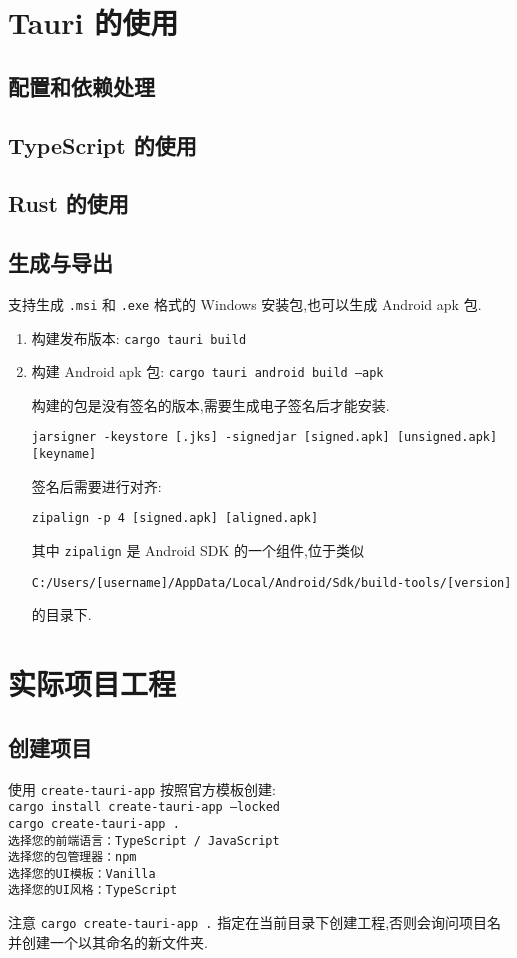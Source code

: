 
\usepackage{../../lectures_preamble}


    \section{Tauri 的使用}
        \subsection{配置和依赖处理}
        \subsection{TypeScript 的使用}
        \subsection{Rust 的使用}
        \subsection{生成与导出}
            支持生成 \texttt{.msi} 和 \texttt{.exe} 格式的 Windows 安装包,也可以生成 Android apk 包.

            \begin{enumerate}
                \item 构建发布版本: \texttt{cargo tauri build}
                \item 构建 Android apk 包: \texttt{cargo tauri android build --apk}

                    构建的包是没有签名的版本,需要生成电子签名后才能安装.

                    \texttt{jarsigner -keystore [.jks] -signedjar [signed.apk] [unsigned.apk] [keyname]}

                    签名后需要进行对齐:

                    \texttt{zipalign -p 4 [signed.apk] [aligned.apk]}

                    其中 \texttt{zipalign} 是 Android SDK 的一个组件,位于类似
                    
                    \texttt{C:/Users/[username]/AppData/Local/Android/Sdk/build-tools/[version]}

                    的目录下.
            \end{enumerate}
    \section{实际项目工程}
        \subsection{创建项目}
            使用 \texttt{create-tauri-app} 按照官方模板创建:
        \texttt{\\cargo install create-tauri-app ---locked\\cargo create-tauri-app .\\选择您的前端语言：TypeScript / JavaScript\\
选择您的包管理器：npm\\
选择您的UI模板：Vanilla\\
选择您的UI风格：TypeScript}

            注意 \texttt{cargo create-tauri-app .} 指定在当前目录下创建工程,否则会询问项目名并创建一个以其命名的新文件夹.


